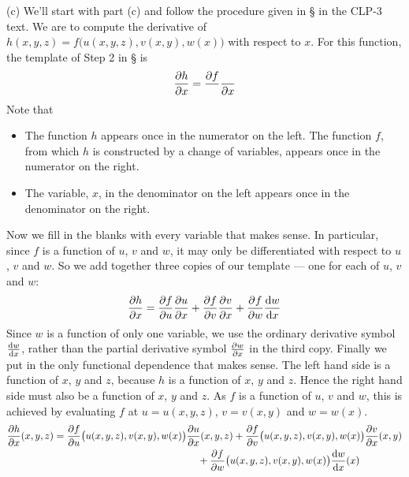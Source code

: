 \begin{solution}

(c) We'll start with part (c) and follow the procedure given in 
\S{} in the CLP-3 text. We are to compute the
derivative of $h(x,y,z)=f\big(u(x,y,z),v(x,y),w(x)\big)$ with respect to 
$x$. For this function, the template of Step 2 in 
\S{} is
\begin{equation*}
\pdiff{h}{x}=\frac{\partial f}{ }\frac{ }{\partial x}
\end{equation*}
Note that 
\begin{itemize}
\item
The function $h$ appears once in the numerator on the left.
The function $f$, from which $h$ is constructed by a change of variables,
appears once in the numerator on the right.

\item
The variable, $x$, in the denominator on the left appears once in the
denominator on the right. 
\end{itemize}
Now we fill in the blanks with every variable that makes sense. In 
particular, since $f$ is a function of $u$, $v$ and $w$, it may only be 
differentiated with respect to $u$, $v$ and $w$. So we add together
three copies of our template --- one for each of $u$, $v$ and $w$:
\begin{align*}
\pdiff{h}{x}=\pdiff{f}{u}\pdiff{u}{x}
             +\pdiff{f}{v}\pdiff{v}{x}
             +\pdiff{f}{w}\diff{w}{x}
\end{align*}
Since $w$ is a function of only one variable, we use the ordinary 
derivative symbol $\diff{w}{x}$, rather than the partial
derivative symbol $\pdiff{w}{x}$ in the third copy.
Finally we put in the only functional dependence that makes sense. 
The left hand side is a function of $x$, $y$ and $z$, because $h$
is a function of $x$, $y$ and $z$. Hence the right hand side must 
also be a function of $x$, $y$ and $z$. As $f$ is a
function of $u$, $v$ and $w$, this is achieved by evaluating $f$ at 
$u=u(x,y,z)$, $v=v(x,y)$ and $w=w(x)$.
\begin{align*}
\pdiff{h}{x}(x,y,z)
&=\pdiff{f}{u}\big(u(x,y,z),v(x,y),w(x)\big)
\pdiff{u}{x}(x,y,z)
+\pdiff{f}{v}\big(u(x,y,z),v(x,y),w(x)\big)
\pdiff{v}{x}(x,y) \\&\hskip2in
+\pdiff{f}{w}\big(u(x,y,z),v(x,y),w(x)\big)
\diff{w}{x}(x)
\end{align*}


\end{solution}
